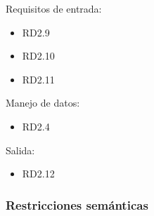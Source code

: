 \begin{itemize}
			Requisitos de entrada:
			\begin{itemize}
				\item RD2.9 %
				\item RD2.10 %
				\item RD2.11 %
			\end{itemize}
			Manejo de datos:
			\begin{itemize}
				\item RD2.4 %
			\end{itemize}
			Salida:
			\begin{itemize}
				\item RD2.12 %
			\end{itemize}

	\end{itemize}


\subsubsection{Restricciones semánticas}
